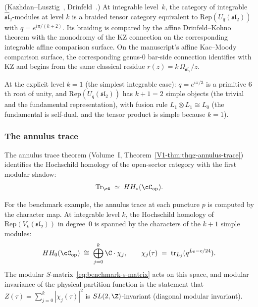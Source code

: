 \begin{proposition}
\label{prop:benchmark-line-operators}
\textup{(Kazhdan--Lusztig~\cite{KL93},
Drinfeld~\cite{Dri89}.)}
At integrable level~$k$, the category of integrable
$\widehat{\mathfrak{sl}}_2$-modules at level $k$ is
a braided tensor category equivalent to
$\mathrm{Rep}(U_q(\mathfrak{sl}_2))$ with $q = e^{i\pi/(k+2)}$.
Its braiding is compared by the affine Drinfeld--Kohno theorem
with the monodromy of the KZ connection on the corresponding
integrable affine comparison surface.
On the manuscript's affine Kac--Moody comparison surface, the
corresponding genus-$0$ bar-side connection identifies with KZ and
begins from the same classical residue
$r(z) = k\,\Omega_{\mathfrak{sl}_2}/z$.
\end{proposition}

At the explicit level $k = 1$ (the simplest integrable case):
$q = e^{i\pi/3}$ is a primitive $6$th root of unity,
and $\mathrm{Rep}(U_q(\mathfrak{sl}_2))$ has
$k + 1 = 2$ simple objects (the trivial and the fundamental
representation), with fusion rule $L_1 \otimes L_1 \cong L_0$
(the fundamental is self-dual, and the tensor product is
simple because $k = 1$).


\subsubsection{The annulus trace}
\label{subsubsec:benchmark-annulus-trace}

The annulus trace theorem
(Volume~I, Theorem~\ref*{V1-thm:thqg-annulus-trace}) identifies the
Hochschild homology of the open-sector category with the first
modular shadow:
\begin{equation}\label{eq:benchmark-annulus-trace}
 \mathrm{Tr}_\cA
 \;\simeq\;
 HH_*(\cC_{\mathrm{op}}).
\end{equation}

For the benchmark example, the annulus trace at each puncture
$p$ is computed by the character map.
At integrable level $k$, the Hochschild homology of
$\mathrm{Rep}(V_k(\mathfrak{sl}_2))$ in degree~$0$ is spanned
by the characters of the $k + 1$ simple modules:
\begin{equation}\label{eq:benchmark-characters}
 HH_0(\cC_{\mathrm{op}})
 \;\cong\;
 \bigoplus_{j=0}^k \C \cdot \chi_j,
 \qquad
 \chi_j(\tau)
 \;=\;
 \mathrm{tr}_{L_j}(q^{L_0 - c/24}).
\end{equation}
The modular $S$-matrix~\eqref{eq:benchmark-s-matrix} acts on this
space, and modular invariance of the physical partition function
is the statement that $Z(\tau) = \sum_{j=0}^k |\chi_j(\tau)|^2$
is $SL(2,\Z)$-invariant (diagonal modular invariant).

